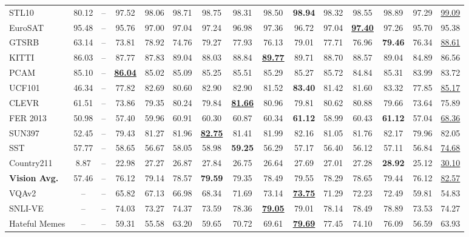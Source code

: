 \documentclass[10pt,twocolumn,letterpaper]{article}
\begin{document}
\begin{table*}[ht]
\begin{tabular}{lccccccccccccc|c}
STL10 & 80.12 & -- & 97.52 & 98.06 & 98.71 & 98.75 & 98.31 & 98.50 & \textbf{98.94} & 98.32 & 98.55 & 98.89 & 97.29 & \underline{99.09} \\
EuroSAT & 95.48 & -- & 95.76 & 97.00 & 97.04 & 97.24 & 96.98 & 97.36 & 96.72 & 97.04 & \textbf{\underline{97.40}} & 97.26 & 95.70 & 95.38 \\
GTSRB & 63.14 & -- & 73.81 & 78.92 & 74.76 & 79.27 & 77.93 & 76.13 & 79.01 & 77.71 & 76.96 & \textbf{79.46} & 76.34 & \underline{88.61} \\
KITTI & 86.03 & -- & 87.77 & 87.83 & 89.04 & 88.03 & 88.84 & \textbf{\underline{89.77}} & 89.71 & 88.70 & 88.57 & 89.04 & 84.89 & 86.56 \\
PCAM & 85.10 & -- & \textbf{\underline{86.04}} & 85.02 & 85.09 & 85.25 & 85.51 & 85.29 & 85.27 & 85.72 & 84.84 & 85.31 & 83.99 & 83.72 \\
UCF101 & 46.34 & -- & 77.82 & 82.69 & 80.60 & 82.90 & 82.90 & 81.52 & \textbf{83.40} & 81.42 & 81.60 & 83.32 & 77.85 & \underline{85.17} \\
CLEVR & 61.51 & -- & 73.86 & 79.35 & 80.24 & 79.84 & \textbf{\underline{81.66}} & 80.96 & 79.81 & 80.62 & 80.88 & 79.66 & 73.64 & 75.89 \\
FER 2013 & 50.98 & -- & 57.40 & 59.96 & 60.91 & 60.30 & 60.87 & 60.34 & \textbf{61.12} & 58.99 & 60.43 & \textbf{61.12} & 57.04 & \underline{68.36} \\
SUN397 & 52.45 & -- & 79.43 & 81.27 & 81.96 & \textbf{\underline{82.75}} & 81.41 & 81.99 & 82.16 & 81.05 & 81.76 & 82.17 & 79.96 & 82.05 \\
SST & 57.77 & -- & 58.65 & 56.67 & 58.05 & 58.98 & \textbf{59.25} & 56.29 & 57.17 & 56.40 & 56.12 & 57.11 & 56.84 & \underline{74.68} \\
Country211 & 8.87 & -- & 22.98 & 27.27 & 26.87 & 27.84 & 26.75 & 26.64 & 27.69 & 27.01 & 27.28 & \textbf{28.92} & 25.12 & \underline{30.10} \\
\midrule
\textbf{Vision Avg.} & 57.46 & -- & 76.12 & 79.14 & 78.57 & \textbf{79.59} & 79.35 & 78.49 & 79.55 & 78.29 & 78.65 & 79.44 & 76.12 & \underline{82.57} \\
\midrule
VQAv2 & -- & -- & 65.82 & 67.13 & 66.98 & 68.34 & 71.69 & 73.14 & \textbf{\underline{73.75}} & 71.29 & 72.23 & 72.49 & 59.81 & 54.83 \\
SNLI-VE & -- & -- & 74.03 & 73.27 & 74.37 & 73.59 & 78.36 & \textbf{\underline{79.05}} & 79.01 & 78.14 & 78.49 & 78.89 & 73.53 & 74.27 \\
Hateful Memes & -- & -- & 59.31 & 55.58 & 63.20 & 59.65 & 70.72 & 69.61 & \textbf{\underline{79.69}} & 77.45 & 74.10 & 76.09 & 56.59 & 63.93 \\

\end{tabular}
\end{table*}
\end{document}
